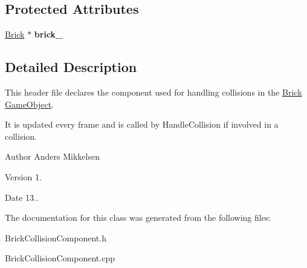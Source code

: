 \subsection*{Protected Attributes}
\begin{DoxyCompactItemize}
\item 
\hypertarget{class_brick_collision_component_af80c273547fd6e0e8046183dea6f3105}{}\hyperlink{class_brick}{Brick} $\ast$ {\bfseries brick\+\_\+}\label{class_brick_collision_component_af80c273547fd6e0e8046183dea6f3105}

\end{DoxyCompactItemize}


\subsection{Detailed Description}
This header file declares the component used for handling collisions in the \hyperlink{class_brick}{Brick} \hyperlink{class_game_object}{Game\+Object}. 

It is updated every frame and is called by Handle\+Collision if involved in a collision.

\begin{DoxyAuthor}{Author}
Anders Mikkelsen 
\end{DoxyAuthor}
\begin{DoxyVersion}{Version}
1. 
\end{DoxyVersion}
\begin{DoxyDate}{Date}
13.. 
\end{DoxyDate}


The documentation for this class was generated from the following files\+:\begin{DoxyCompactItemize}
\item 
Brick\+Collision\+Component.\+h\item 
Brick\+Collision\+Component.\+cpp\end{DoxyCompactItemize}

